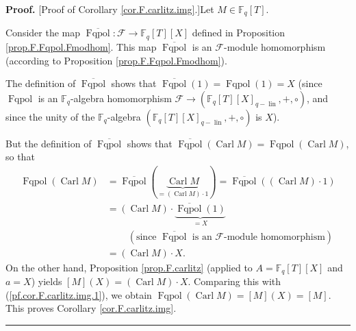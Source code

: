 \documentclass[numbers=enddot,12pt,final,onecolumn,notitlepage]{scrartcl}%
\theoremstyle{definition}
\newenvironment{proof}[1][Proof]{\noindent\textbf{#1.} }{\ \rule{0.5em}{0.5em}}
\begin{document}
\begin{proof}
[Proof of Corollary \ref{cor.F.carlitz.img}.]Let $M\in\mathbb{F}_{q}\left[
T\right]  $.

Consider the map $\overline{\operatorname*{Fqpol}}:\mathcal{F}\rightarrow
\mathbb{F}_{q}\left[  T\right]  \left[  X\right]  $ defined in Proposition
\ref{prop.F.Fqpol.Fmodhom}. This map $\overline{\operatorname*{Fqpol}}$ is an
$\mathcal{F}$-module homomorphism (according to Proposition
\ref{prop.F.Fqpol.Fmodhom}).

The definition of $\overline{\operatorname*{Fqpol}}$ shows that $\overline
{\operatorname*{Fqpol}}\left(  1\right)  =\operatorname*{Fqpol}\left(
1\right)  =X$ (since $\operatorname*{Fqpol}$ is an $\mathbb{F}_{q}$-algebra
homomorphism $\mathcal{F}\rightarrow\left(  \mathbb{F}_{q}\left[  T\right]
\left[  X\right]  _{q-\operatorname*{lin}},+,\circ\right)  $, and since the
unity of the $\mathbb{F}_{q}$-algebra $\left(  \mathbb{F}_{q}\left[  T\right]
\left[  X\right]  _{q-\operatorname*{lin}},+,\circ\right)  $ is $X$).

But the definition of $\overline{\operatorname*{Fqpol}}$ shows that
$\overline{\operatorname*{Fqpol}}\left(  \operatorname*{Carl}M\right)
=\operatorname*{Fqpol}\left(  \operatorname*{Carl}M\right)  $, so that%
\begin{align}
\operatorname*{Fqpol}\left(  \operatorname*{Carl}M\right)   &  =\overline
{\operatorname*{Fqpol}}\left(  \underbrace{\operatorname*{Carl}M}_{=\left(
\operatorname*{Carl}M\right)  \cdot1}\right)  =\overline{\operatorname*{Fqpol}%
}\left(  \left(  \operatorname*{Carl}M\right)  \cdot1\right) \nonumber\\
&  =\left(  \operatorname*{Carl}M\right)  \cdot\underbrace{\overline
{\operatorname*{Fqpol}}\left(  1\right)  }_{=X}\nonumber\\
&  \ \ \ \ \ \ \ \ \ \ \left(  \text{since }\overline{\operatorname*{Fqpol}%
}\text{ is an }\mathcal{F}\text{-module homomorphism}\right) \nonumber\\
&  =\left(  \operatorname*{Carl}M\right)  \cdot X.
\label{pf.cor.F.carlitz.img.1}%
\end{align}
On the other hand, Proposition \ref{prop.F.carlitz} (applied to $A=\mathbb{F}%
_{q}\left[  T\right]  \left[  X\right]  $ and $a=X$) yields $\left[  M\right]
\left(  X\right)  =\left(  \operatorname*{Carl}M\right)  \cdot X$. Comparing
this with (\ref{pf.cor.F.carlitz.img.1}), we obtain $\operatorname*{Fqpol}%
\left(  \operatorname*{Carl}M\right)  =\left[  M\right]  \left(  X\right)
=\left[  M\right]  $. This proves Corollary \ref{cor.F.carlitz.img}.
\end{proof}
\end{document}
